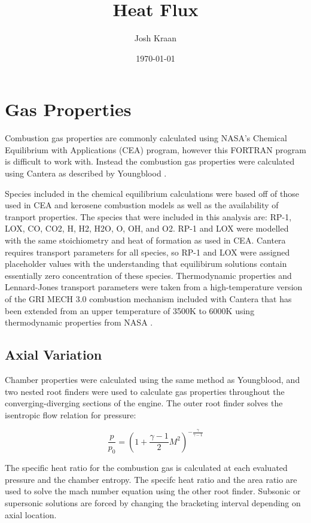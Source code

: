 \documentclass[11pt]{article}
\title{Heat Flux}
\author{Josh Kraan}
\date{\today}
\begin{document}
\maketitle

\section{Gas Properties}


Combustion gas properties are commonly calculated using NASA's Chemical Equilibrium with Applications (CEA) \cite{} program, however this FORTRAN program is difficult to work with. Instead the combustion gas properties were calculated using Cantera as described by Youngblood \cite{}.

Species included in the chemical equilibrium calculations were based off of those used in CEA and kerosene combustion models \cite{} as well as the availability of tranport properties. The species that were included in this analysis are: RP-1, LOX, CO, CO2, H, H2, H2O, O, OH, and O2. RP-1 and LOX were modelled with the same stoichiometry and heat of formation as used in CEA. Cantera requires transport parameters for all species, so RP-1 and LOX were assigned placeholder values with the understanding that equilibirum solutions contain essentially zero concentration of these species. Thermodynamic properties and Lennard-Jones transport parameters were taken from a high-temperature version of the GRI MECH 3.0 combustion mechanism \cite{} included with Cantera that has been extended from an upper temperature of 3500K to 6000K using thermodynamic properties from NASA \cite{}.

\subsection{Axial Variation}


Chamber properties were calculated using the same method as Youngblood, and two nested root finders were used to calculate gas properties throughout the converging-diverging sections of the engine. The outer root finder solves the isentropic flow relation for pressure: %

\begin{equation}
  \frac{p}{p_0} = (1 + \frac{\gamma - 1}{2} M^2) ^ {- \frac{\gamma}{\gamma - 1}}
\end{equation}

The specific heat ratio for the combustion gas is calculated at each evaluated pressure and the chamber entropy. The specifc heat ratio and the area ratio are used to solve the mach number equation using the other root finder. Subsonic or supersonic solutions are forced by changing the bracketing interval depending on axial location.
\end{document}
